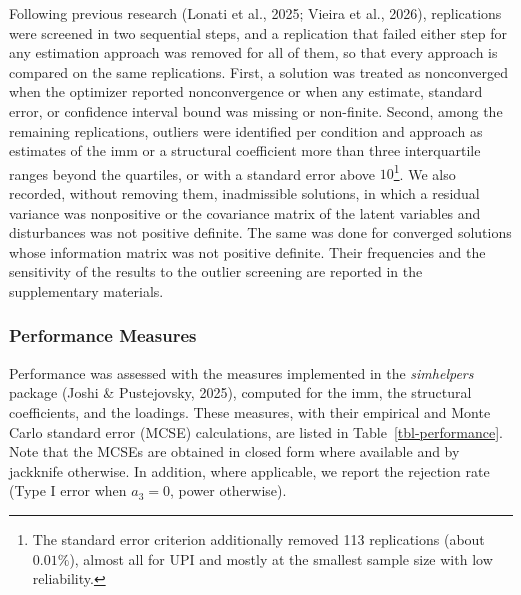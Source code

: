\documentclass[
  man,
  longtable,
  nolmodern,
  notxfonts,
  notimes,
  colorlinks=true,linkcolor=blue,citecolor=blue,urlcolor=blue]{apa7}
\begin{document}
Following previous research (Lonati et al., 2025; Vieira et al., 2026),
replications were screened in two sequential steps, and a replication
that failed either step for any estimation approach was removed for all
of them, so that every approach is compared on the same replications.
First, a solution was treated as nonconverged when the optimizer
reported nonconvergence or when any estimate, standard error, or
confidence interval bound was missing or non-finite. Second, among the
remaining replications, outliers were identified per condition and
approach as estimates of the imm or a structural coefficient more than
three interquartile ranges beyond the quartiles, or with a standard
error above \(10\)\footnote{The standard error criterion additionally
  removed 113 replications (about \(0.01\%\)), almost all for UPI and
  mostly at the smallest sample size with low reliability.}. We also
recorded, without removing them, inadmissible solutions, in which a
residual variance was nonpositive or the covariance matrix of the latent
variables and disturbances was not positive definite. The same was done
for converged solutions whose information matrix was not positive
definite. Their frequencies and the sensitivity of the results to the
outlier screening are reported in the supplementary materials.

\subsubsection{Performance Measures}\label{performance-measures}

Performance was assessed with the measures implemented in the
\emph{simhelpers} package (Joshi \& Pustejovsky, 2025), computed for the
imm, the structural coefficients, and the loadings. These measures, with
their empirical and Monte Carlo standard error (MCSE) calculations, are
listed in Table~\ref{tbl-performance}. Note that the MCSEs are obtained
in closed form where available and by jackknife otherwise. In addition,
where applicable, we report the rejection rate (Type I error when
\(a_3 = 0\), power otherwise).
\end{document}
